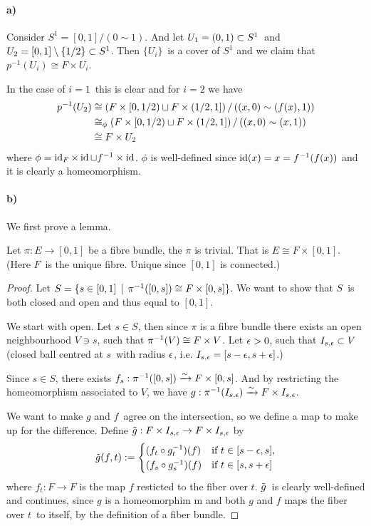 \documentclass[a4paper,11pt,english]{article}
\begin{document}
\begin{exercise}[3]
\paragraph{a)} Consider $S^1 = [0,1] / (0\sim 1)$. And let $U_1 = (0,1) \ss S^1$ and $U_2 =
[0,1] \setminus \{1/2\} \ss S^1$. Then $\{ U_i \}$ is a cover of $S^1$ and we claim that
$p^{-1}(U_i) \cong F \times U_i$.

In the case of $i=1$ this is clear and for $i=2$ we have
\begin{align*}
p\i (U_2) &\cong \left( F\times [0,1/2) \sqcup F \times (1/2,1] \right) /
\left( (x,0) \sim (f(x),1) \right) \\
&\cong_\phi \left( F\times [0,1/2) \sqcup F \times (1/2,1] \right) /
\left( (x,0) \sim (x,1) \right) \\
&\cong F \times U_2
\end{align*}
where $\phi = \id_F \times \id \sqcup f^{-1} \times \id$. $\phi$ is well-defined
since $\id(x) = x = f^{-1}(f(x))$ and it is clearly a homeomorphism.

\paragraph{b)} We first prove a lemma.
\begin{lemma}
Let $\pi: E \to [0,1]$ be a fibre bundle, the $\pi$ is trivial. That is
$E \cong F \times [0,1]$. (Here $F$ is the unique fibre. Unique since $[0,1]$ is
connected.)
\end{lemma}

\newcommand{\Bes}{I_{s,\eps}}

\begin{proof}
Let $S = \{s\in[0,1] \q| \pi\i([0,s]) \cong F \times [0,s] \}$. We want to show
that $S$ is both closed and open and thus equal to $[0,1]$.

We start with open. Let $s \in S$, then since $\pi$ is a fibre bundle there
exists an open neighbourhood $V\ni s$, such that $\pi\i(V) \cong F \times V$.
Let $\eps > 0$, such that $\Bes \ss V$ (closed ball centred at $s$ with
radius $\eps$, i.e. $\Bes = [s-\eps, s+\eps]$.)

Since $s \in S$, there exists $f_s: \pi\i([0,s]) \congto F\times [0,s]$. And by
restricting the homeomorphism associated to $V$, we have $g: \pi\i(\Bes) \congto F
\times \Bes$.

We want to make $g$ and $f$ agree on the intersection, so we define a map to
make up for the difference. Define $\til g: F\times \Bes \to F\times\Bes$ by
\[ \til g(f,t) := \pwf{
(f_t \circ g_t\i)(f) &\tif t\in[s-\eps, s], \\
(f_s \circ g_s\i)(f) &\tif t\in[s, s+\eps] } \]
where $f_t : F \to F$ is the map $f$ resticted to the fiber over $t$.
$\til g$ is clearly well-defined and continues, since $g$ is a homeomorphim
m and
both $g$ and $f$ maps the fiber over $t$ to itself, by the definition of a fiber
bundle.


\end{proof}
\end{exercise}
\end{document}

